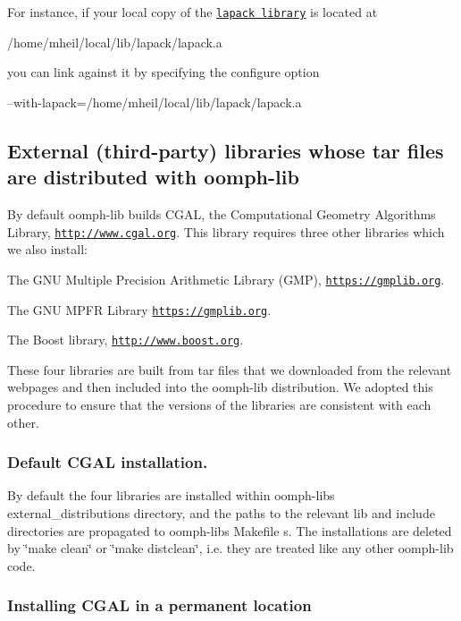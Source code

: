For instance, if your local copy of the \href{http://netlib.org/lapack}{\tt lapack library} is located at 
\begin{DoxyCode}
/home/mheil/local/lib/lapack/lapack.a
\end{DoxyCode}
 you can link against it by specifying the configure option 
\begin{DoxyCode}
--with-lapack=/home/mheil/local/lib/lapack/lapack.a
\end{DoxyCode}
\hypertarget{index_external_dist_cgal_etc}{}\subsection{External (third-\/party) libraries whose tar files are distributed with oomph-\/lib}\label{index_external_dist_cgal_etc}
By default {\ttfamily oomph-\/lib} builds C\+G\+AL, the Computational Geometry Algorithms Library, \href{http://www.cgal.org}{\tt http\+://www.\+cgal.\+org}. This library requires three other libraries which we also install\+:
\begin{DoxyItemize}
\item The G\+NU Multiple Precision Arithmetic Library (G\+MP), \href{https://gmplib.org}{\tt https\+://gmplib.\+org}.
\item The G\+NU M\+P\+FR Library \href{http://www.mpfr.org}{\tt https\+://gmplib.\+org}.
\item The Boost library, \href{http://www.boost.org}{\tt http\+://www.\+boost.\+org}.
\end{DoxyItemize}These four libraries are built from tar files that we downloaded from the relevant webpages and then included into the {\ttfamily oomph-\/lib} distribution. We adopted this procedure to ensure that the versions of the libraries are consistent with each other.\hypertarget{index_cgal_default_install}{}\subsubsection{Default C\+G\+A\+L installation.}\label{index_cgal_default_install}
By default the four libraries are installed within {\ttfamily oomph-\/lib\textquotesingle{}s} {\ttfamily external\+\_\+distributions} directory, and the paths to the relevant {\ttfamily lib} and {\ttfamily include} directories are propagated to {\ttfamily oomph-\/lib\textquotesingle{}s} {\ttfamily Makefile} s. The installations are deleted by \char`\"{}make clean\char`\"{} or \char`\"{}make distclean\char`\"{}, i.\+e. they are treated like any other {\ttfamily oomph-\/lib} code.\hypertarget{index_cgal_permanent_install}{}\subsubsection{Installing C\+G\+A\+L in a permanent location}\label{index_cgal_permanent_install}
